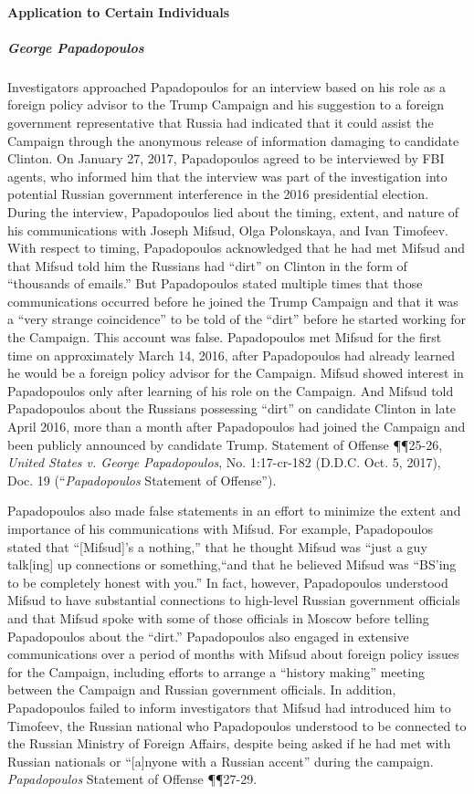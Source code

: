\paragraph{Application to Certain Individuals}

\subparagraph{George Papadopoulos}
Investigators approached Papadopoulos for an interview based on his role as a foreign policy advisor to the Trump Campaign and his suggestion to a foreign government representative that Russia had indicated that it could assist the Campaign through the anonymous release of information damaging to candidate Clinton.
On January 27, 2017, Papadopoulos agreed to be interviewed by FBI agents, who informed him that the interview was part of the investigation into potential Russian government interference in the 2016 presidential election.
During the interview, Papadopoulos lied about the timing, extent, and nature of his communications with Joseph Mifsud, Olga Polonskaya, and Ivan Timofeev.
With respect to timing, Papadopoulos acknowledged that he had met Mifsud and that Mifsud told him the Russians had ``dirt'' on Clinton in the form of ``thousands of emails.''
But Papadopoulos stated multiple times that those communications occurred before he joined the Trump Campaign and that it was a ``very strange coincidence'' to be told of the ``dirt'' before he started working for the Campaign.
This account was false.
Papadopoulos met Mifsud for the first time on approximately March 14, 2016, after Papadopoulos had already learned he would be a foreign policy advisor for the Campaign.
Mifsud showed interest in Papadopoulos only after learning of his role on the Campaign.
And Mifsud told Papadopoulos about the Russians possessing ``dirt'' on candidate Clinton in late April 2016, more than a month after Papadopoulos had joined the Campaign and been publicly announced by candidate Trump.
Statement of Offense \P\P 25-26, \textit{United States v. George Papadopoulos}, No. 1:17-cr-182 (D.D.C. Oct. 5, 2017), Doc. 19 (``\textit{Papadopoulos} Statement of Offense'').

Papadopoulos also made false statements in an effort to minimize the extent and importance of his communications with Mifsud.
For example, Papadopoulos stated that ``[Mifsud]'s a nothing,'' that he thought Mifsud was ``just a guy talk[ing] up connections or something,``and that he believed Mifsud was ``BS'ing to be completely honest with you.''
In fact, however, Papadopoulos understood Mifsud to have substantial connections to high-level Russian government officials and that Mifsud spoke with some of those officials in Moscow before telling Papadopoulos about the ``dirt.''
Papadopoulos also engaged in extensive communications over a period of months with Mifsud about foreign policy issues for the Campaign, including efforts to arrange a ``history making'' meeting between the Campaign and Russian government officials.
In addition, Papadopoulos failed to inform investigators that Mifsud had introduced him to Timofeev, the Russian national who Papadopoulos understood to be connected to the Russian Ministry of Foreign Affairs, despite being asked if he had met with Russian nationals or ``[a]nyone with a Russian accent'' during the campaign.
\textit{Papadopoulos} Statement of Offense \P\P 27-29.


